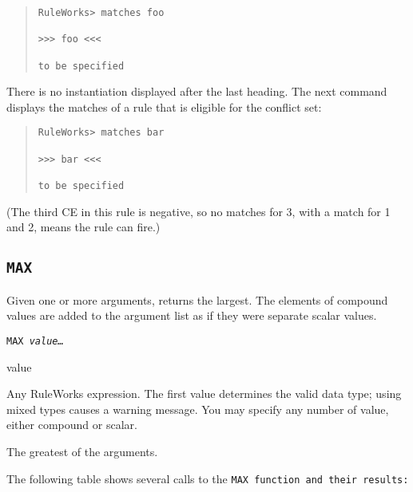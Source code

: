 \begin{quote}
\begin{verbatim}
RuleWorks> matches foo

>>> foo <<<

to be specified
\end{verbatim}
\end{quote}

\begin{note}
  There is no instantiation displayed after the last heading. The next
  command displays the matches of a rule that is eligible for the
  conflict set:
\end{note}

\begin{quote}
\begin{verbatim}
RuleWorks> matches bar

>>> bar <<<

to be specified
\end{verbatim}
\end{quote}

(The third CE in this rule is negative, so no matches for 3, with a
match for 1 and 2, means the rule can fire.)

\subsection{\tt{MAX}}

Given one or more arguments, returns the largest. The
elements of compound values are added to the argument list as
if they were separate scalar values.

\Format

\tt{MAX} \it{value}\ldots

\begin{arguments}

\item[value]

  Any RuleWorks expression. The first value determines the valid data
  type; using mixed types causes a warning message.  You may specify
  any number of value, either compound or scalar.
\end{arguments}

\ReturnValue

The greatest of the arguments.

\Example

The following table shows several calls to the \tt{MAX} function and
their results:

